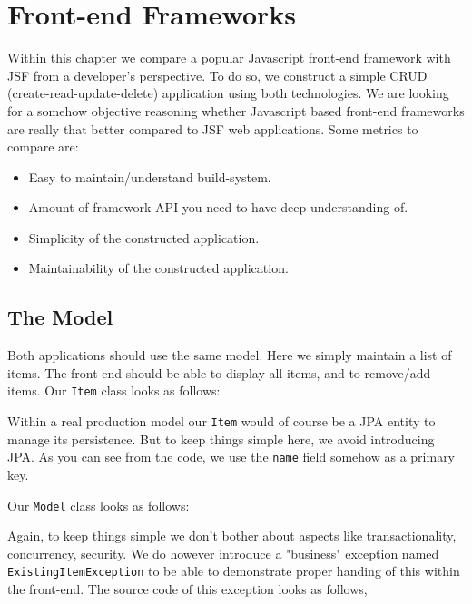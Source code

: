 %

\chapter{Front-end Frameworks}
Within this chapter we compare a popular Javascript front-end framework with JSF from a developer's perspective.
To do so, we construct a simple CRUD (create-read-update-delete) application using both technologies.
We are looking for a somehow objective reasoning whether Javascript based front-end frameworks are really that better compared to JSF web applications.
Some metrics to compare are:
\begin{itemize}
	\item Easy to maintain/understand build-system.
	\item Amount of framework API you need to have deep understanding of.
	\item Simplicity of the constructed application.
	\item Maintainability of the constructed application.
\end{itemize}

\section{The Model}
Both applications should use the same model.
Here we simply maintain a list of items.
The front-end should be able to display all items, and to remove/add items.
Our \texttt{Item} class looks as follows:

Within a real production model our \texttt{Item} would of course be a JPA entity to manage its persistence.
But to keep things simple here, we avoid introducing JPA.
As you can see from the code, we use the \texttt{name} field somehow as a primary key.

Our \texttt{Model} class looks as follows:

Again, to keep things simple we don't bother about aspects like transactionality, concurrency, security.
We do however introduce a "business" exception named \texttt{ExistingItem\allowbreak Exception} to be able to demonstrate proper handing of this within the front-end.
The source code of this exception looks as follows,


